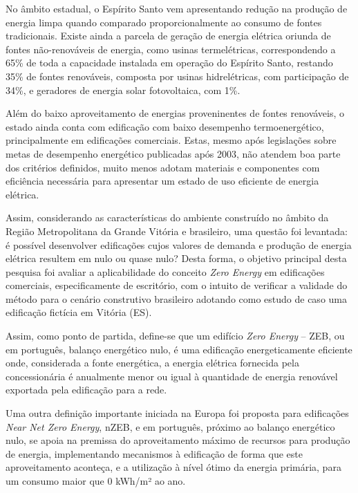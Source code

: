 \begin{onehalfspace}
    \noindent No âmbito estadual, o Espírito Santo vem apresentando redução na produção 
    de energia limpa quando comparado proporcionalmente ao consumo de fontes tradicionais. 
    Existe ainda a parcela de geração de energia elétrica oriunda de fontes não-renováveis 
    de energia, como usinas termelétricas, correspondendo a 65\% de toda a capacidade 
    instalada em operação do Espírito Santo, restando 35\% de fontes renováveis, composta 
    por usinas hidrelétricas, com participação de 34\%, e geradores de energia solar 
    fotovoltaica, com 1\%.\vspace*{0.3cm}

    \noindent Além do baixo aproveitamento de energias proveninentes de fontes renováveis,
    o estado ainda conta com edificação com baixo desempenho termoenergético, principalmente
    em edificações comerciais. Estas, mesmo após legislações sobre metas de desempenho 
    energético publicadas após 2003, não atendem boa parte dos critérios definidos, muito
    menos adotam materiais e componentes com eficiência necessária para apresentar um estado
    de uso eficiente de energia elétrica.

    \noindent Assim, considerando as características do ambiente construído no âmbito da 
    Região Metropolitana da Grande Vitória e brasileiro, uma questão foi levantada: 
    é possível desenvolver edificações cujos valores de demanda e produção de energia 
    elétrica resultem em nulo ou quase nulo? Desta forma, o objetivo principal desta pesquisa 
    foi avaliar a aplicabilidade do conceito \textit{Zero Energy} em edificações 
    comerciais, especificamente de escritório, com o intuito de verificar a validade do 
    método para o cenário construtivo brasileiro adotando como estudo de caso uma 
    edificação fictícia em Vitória (ES).\vspace*{0.3cm}

    \noindent Assim, como ponto de partida, define-se que um edifício 
    \textit{Zero Energy} – ZEB, ou em português, balanço energético nulo, é uma 
    edificação energeticamente eficiente onde, considerada a fonte energética, a 
    energia elétrica fornecida pela concessionária é anualmente menor ou igual à 
    quantidade de energia renovável exportada pela edificação para a rede.\vspace*{0.3cm}

    \noindent Uma outra definição importante iniciada na Europa foi proposta para 
    edificações \textit{Near Net Zero Energy}, nZEB, e em português, próximo ao 
    balanço energético nulo, se apoia na premissa do aproveitamento máximo 
    de recursos para produção de energia, implementando mecanismos à edificação de 
    forma que este aproveitamento aconteça, e a utilização à nível ótimo da energia 
    primária, para um consumo maior que 0 kWh/m² ao ano.\vspace*{0.3cm}


\end{onehalfspace}
